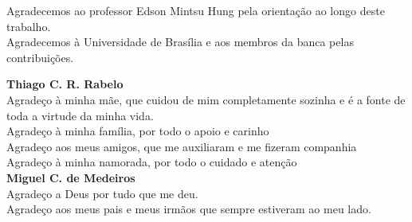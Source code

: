 Agradecemos ao professor Edson Mintsu Hung pela orientação
ao longo deste trabalho. \\
Agradecemos à Universidade de Brasília e aos membros da banca
pelas contribuições.

\vspace{1em}
\noindent\textbf{Thiago C. R. Rabelo}\\
Agradeço à minha mãe, que cuidou de mim completamente sozinha e é a fonte de toda a virtude da minha vida.\\
Agradeço à minha família, por todo o apoio e carinho\\
Agradeço aos meus amigos, que me auxiliaram e me fizeram companhia\\
Agradeço à minha namorada, por todo o cuidado e atenção\\

\vspace{1em}
\noindent\textbf{Miguel C. de Medeiros}\\
Agradeço a Deus por tudo que me deu.\\
Agradeço aos meus pais e meus irmãos que sempre estiveram ao meu lado.\\

